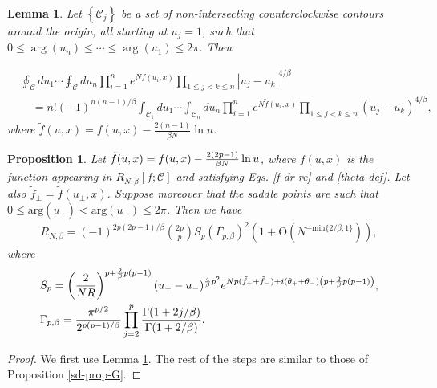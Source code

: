 \documentclass[11pt,a4paper]{article}
\numberwithin{equation}{section} %
\theoremstyle{plain}
\newtheorem{prop}{Proposition}
\newtheorem{lemma}{Lemma}
\theoremstyle{definition}
\numberwithin{prop}{section}
\numberwithin{cor}{section}
\numberwithin{remark}{section}
\begin{document}
\begin{lemma}\label{lem2}
    Let $\left\{\mathcal{C}_j\right\}$ be a set of non-intersecting counterclockwise contours around the origin, all starting at $u_j=1$, such that $0 \leqslant \arg \left(u_n\right) \leqslant \cdots \leqslant \arg \left(u_1\right) \leqslant 2 \pi$. Then

$$
\begin{aligned}
& \oint_{\mathcal{C}} d u_1 \cdots \oint_{\mathcal{C}} d u_n \prod_{i=1}^n e^{N f\left(u_i, x\right)} \prod_{1 \leqslant j<k \leqslant n}\left|u_j-u_k\right|^{4 / \beta} \\
& \quad=n!(-1)^{n(n-1) / \beta} \int_{\mathcal{C}_1} d u_1 \cdots \int_{\mathcal{C}_n} d u_n \prod_{i=1}^n e^{N \tilde{f}\left(u_i, x\right)} \prod_{1 \leqslant j<k \leqslant n}\left(u_j-u_k\right)^{4 / \beta},
\end{aligned}
$$
where $\tilde{f}(u, x)=f(u, x)-\frac{2(n-1)}{\beta N} \ln u$.
\end{lemma}

\begin{prop}\label{sd-prop-LJ}
    Let $\tilde{f}(u, x)=f(u, x)-{2(2p-1)\over \beta N} \ln u$, where $f (u, x)$ is the function appearing in $R_{N,\beta}[f;\mathcal{C}]$ and satisfying Eqs. \eqref{f-dr-re} and \eqref{theta-def}. Let also $\tilde{f}_{\pm}=\tilde{f}(u_{\pm},x)$. Suppose moreover that the saddle points are such that $0\leq \mathrm{arg}(u_+)<\mathrm{arg}(u_-)\leq 2\pi$. Then we have
	\begin{align}\label{RNb-LJ}
		R_{N,\beta}=(-1)^{2p(2p-1)/\beta}\binom{2p}{p}S_{p}(\Gamma_{p,\beta})^{2}\left(1+\mathrm{O}\left( N^{-\mathrm{min}\{2/\beta,1\}}\right)\right),
	\end{align}
	where 
	\begin{align*}
		&S_p=\left({2\over NR}\right)^{p+{2\over\beta}p(p-1)}(u_+-u_-)^{{4\over\beta}p^2}e^{Np(\tilde{f}_++\tilde{f}_-)+i(\theta_{+}+\theta_{-})\left(p+{2\over\beta}p(p-1)\right)},\\
		&\begin{aligned}
			\Gamma_{p, \beta} =\frac{\pi^{p / 2}}{2^{p(p-1) / \beta}} \prod_{j=2}^p \frac{\Gamma(1+2 j / \beta)}{\Gamma(1+2 / \beta)} .
		\end{aligned}
	\end{align*}
\end{prop}
\begin{proof}
    We first use Lemma \ref{lem2}. The rest of the steps are similar to those of Proposition \ref{sd-prop-G}.
\end{proof}
\end{document}
